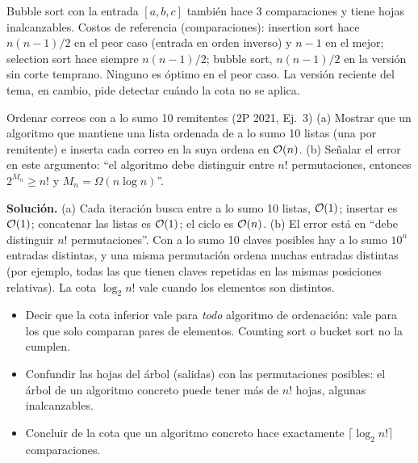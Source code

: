 Bubble sort con la entrada $[a,b,c]$ también hace 3 comparaciones y tiene hojas inalcanzables. Costos de referencia (comparaciones): insertion sort hace $n(n-1)/2$ en el peor caso (entrada en orden inverso) y $n-1$ en el mejor; selection sort hace siempre $n(n-1)/2$; bubble sort, $n(n-1)/2$ en la versión sin corte temprano. Ninguno es óptimo en el peor caso. La versión reciente del tema, en cambio, pide detectar cuándo la cota no se aplica.

\begin{problema}{Ordenar correos con a lo sumo 10 remitentes (2P 2021, Ej.~3)}
(a) Mostrar que un algoritmo que mantiene una lista ordenada de a lo sumo 10 listas (una por remitente) e inserta cada correo en la suya ordena en $\mathcal{O}(n)$. (b) Señalar el error en este argumento: ``el algoritmo debe distinguir entre $n!$ permutaciones, entonces $2^{M_n}\ge n!$ y $M_n=\Omega(n\log n)$''.

\textbf{Solución.} (a) Cada iteración busca entre a lo sumo 10 listas, $\mathcal{O}(1)$; insertar es $\mathcal{O}(1)$; concatenar las listas es $\mathcal{O}(1)$; el ciclo es $\mathcal{O}(n)$. (b) El error está en ``debe distinguir $n!$ permutaciones''. Con a lo sumo 10 claves posibles hay a lo sumo $10^n$ entradas distintas, y una misma permutación ordena muchas entradas distintas (por ejemplo, todas las que tienen claves repetidas en las mismas posiciones relativas). La cota $\log_2 n!$ vale cuando los elementos son distintos.
\end{problema}

\begin{trampa}
\begin{itemize}
  \item Decir que la cota inferior vale para \emph{todo} algoritmo de ordenación: vale para los que solo comparan pares de elementos. Counting sort o bucket sort no la cumplen.
  \item Confundir las hojas del árbol (salidas) con las permutaciones posibles: el árbol de un algoritmo concreto puede tener más de $n!$ hojas, algunas inalcanzables.
  \item Concluir de la cota que un algoritmo concreto hace exactamente $\lceil\log_2 n!\rceil$ comparaciones.
\end{itemize}
\end{trampa}

